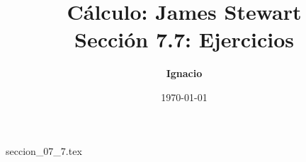 \documentclass[11pt,spanish,oneside]{report}
\title{\textbf{Cálculo: James Stewart} \\ \Large Sección 7.7: Ejercicios}
\author{\textbf{Ignacio}}
\date{\today}
\begin{document}
\maketitle

{seccion_07_7.tex}
\end{document}
